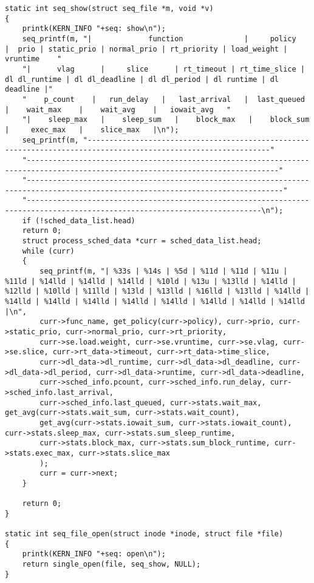 \begin{lstlisting}[label=lst:all_code,caption=Загружаемый модуль ядра]
static int seq_show(struct seq_file *m, void *v)
{
	printk(KERN_INFO "+seq: show\n");
	seq_printf(m, "|             function              |     policy     |  prio | static_prio | normal_prio | rt_priority | load_weight |    vruntime    "
	"|      vlag      |     slice      | rt_timeout | rt_time_slice | dl dl_runtime | dl dl_deadline | dl dl_period | dl runtime | dl deadline |"
	"    p_count    |   run_delay   |   last_arrival   |  last_queued  |    wait_max    |    wait_avg    |   iowait_avg   "
	"|    sleep_max   |    sleep_sum   |    block_max   |    block_sum   |     exec_max   |    slice_max   |\n");
	seq_printf(m, "----------------------------------------------------------------------------------------------------------------"
	"--------------------------------------------------------------------------------------------------------------------------------"
	"---------------------------------------------------------------------------------------------------------------------------------"
	"----------------------------------------------------------------------------------------------------------------------------\n");
	if (!sched_data_list.head) 
	return 0;
	struct process_sched_data *curr = sched_data_list.head;
	while (curr)
	{
		seq_printf(m, "| %33s | %14s | %5d | %11d | %11d | %11u | %11ld | %14lld | %14lld | %14lld | %10ld | %13u | %13lld | %14lld | %12lld | %10lld | %11lld | %13ld | %13lld | %16lld | %13lld | %14lld | %14lld | %14lld | %14lld | %14lld | %14lld | %14lld | %14lld | %14lld |\n", 
		curr->func_name, get_policy(curr->policy), curr->prio, curr->static_prio, curr->normal_prio, curr->rt_priority,
		curr->se.load.weight, curr->se.vruntime, curr->se.vlag, curr->se.slice, curr->rt_data->timeout, curr->rt_data->time_slice, 
		curr->dl_data->dl_runtime, curr->dl_data->dl_deadline, curr->dl_data->dl_period, curr->dl_data->runtime, curr->dl_data->deadline,
		curr->sched_info.pcount, curr->sched_info.run_delay, curr->sched_info.last_arrival, 
		curr->sched_info.last_queued, curr->stats.wait_max, get_avg(curr->stats.wait_sum, curr->stats.wait_count),
		get_avg(curr->stats.iowait_sum, curr->stats.iowait_count), curr->stats.sleep_max, curr->stats.sum_sleep_runtime, 
		curr->stats.block_max, curr->stats.sum_block_runtime, curr->stats.exec_max, curr->stats.slice_max
		);
		curr = curr->next;
	}
	
	return 0;
}

static int seq_file_open(struct inode *inode, struct file *file)
{
	printk(KERN_INFO "+seq: open\n");
	return single_open(file, seq_show, NULL);
}


\end{lstlisting}
